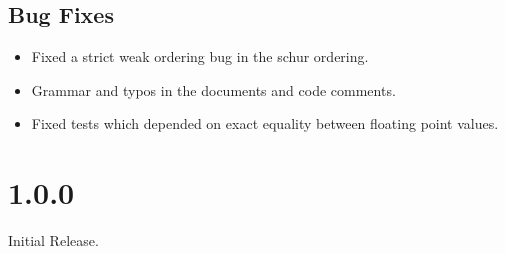 \subsection{Bug Fixes}
\begin{itemize}
\item Fixed a strict weak ordering bug in the schur ordering.
\item Grammar and typos in the documents and code comments.
\item Fixed tests which depended on exact equality between floating point values.
\end{itemize}
\section*{1.0.0}
Initial Release.